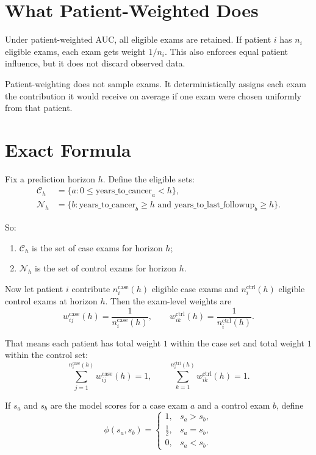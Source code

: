 \documentclass[11pt]{article}
\begin{document}
\section*{What Patient-Weighted Does}
Under patient-weighted AUC, all eligible exams are retained. If patient $i$ has $n_i$ eligible exams, each exam gets weight $1/n_i$. This also enforces equal patient influence, but it does not discard observed data.

Patient-weighting does not sample exams. It deterministically assigns each exam the contribution it would receive on average if one exam were chosen uniformly from that patient.

\section*{Exact Formula}
Fix a prediction horizon $h$. Define the eligible sets:
\begin{align*}
\mathcal{C}_h &= \{a : 0 \le \text{years\_to\_cancer}_a < h\},\\
\mathcal{N}_h &= \{b : \text{years\_to\_cancer}_b \ge h \text{ and } \text{years\_to\_last\_followup}_b \ge h\}.
\end{align*}

So:
\begin{enumerate}[leftmargin=2em]
\item $\mathcal{C}_h$ is the set of case exams for horizon $h$;
\item $\mathcal{N}_h$ is the set of control exams for horizon $h$.
\end{enumerate}

Now let patient $i$ contribute $n_i^{\text{case}}(h)$ eligible case exams and $n_i^{\text{ctrl}}(h)$ eligible control exams at horizon $h$. Then the exam-level weights are
\[
w_{ij}^{\text{case}}(h) = \frac{1}{n_i^{\text{case}}(h)},
\qquad
w_{ik}^{\text{ctrl}}(h) = \frac{1}{n_i^{\text{ctrl}}(h)}.
\]

That means each patient has total weight $1$ within the case set and total weight $1$ within the control set:
\[
\sum_{j=1}^{n_i^{\text{case}}(h)} w_{ij}^{\text{case}}(h)=1,
\qquad
\sum_{k=1}^{n_i^{\text{ctrl}}(h)} w_{ik}^{\text{ctrl}}(h)=1.
\]

If $s_a$ and $s_b$ are the model scores for a case exam $a$ and a control exam $b$, define
\[
\phi(s_a,s_b)=
\begin{cases}
1, & s_a > s_b,\\
\tfrac{1}{2}, & s_a = s_b,\\
0, & s_a < s_b.
\end{cases}
\]
\end{document}
